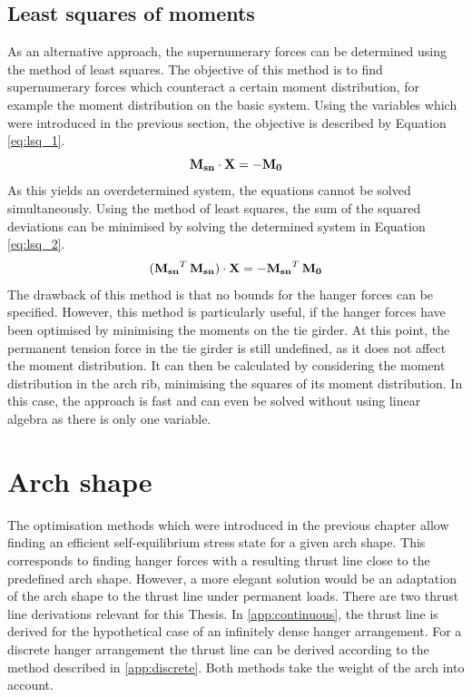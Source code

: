\subsection{Least squares of moments} \label{sec:least_squares}
As an alternative approach, the supernumerary forces can be determined using the method of least squares. The objective of this method is to find supernumerary forces which counteract a certain moment distribution, for example the moment distribution on the basic system. Using the variables which were introduced in the previous section, the objective is described by Equation \eqref{eq:lsq_1}.
\begin{equation}
    {\bf M_{sn}} \cdot {\bf X} = -{\bf M_0}
    \label{eq:lsq_1}
\end{equation}
As this yields an overdetermined system, the equations cannot be solved simultaneously. Using the method of least squares, the sum of the squared deviations can be minimised by solving the determined system in Equation \eqref{eq:lsq_2}.
\begin{equation}
    ({\bf M_{sn}}^T\,{\bf M_{sn}}) \cdot {\bf X} = -{\bf M_{sn}}^T\,{\bf M_0}
    \label{eq:lsq_2}
\end{equation}
The drawback of this method is that no bounds for the hanger forces can be specified. However, this method is particularly useful, if the hanger forces have been optimised by minimising the moments on the tie girder. At this point, the permanent tension force in the tie girder is still undefined, as it does not affect the moment distribution. It can then be calculated by considering the moment distribution in the arch rib, minimising the squares of its moment distribution. In this case, the approach is fast and can even be solved without using linear algebra as there is only one variable.


\newpage
\section{Arch shape} \label{sec:met_arch}
The optimisation methods which were introduced in the previous chapter allow finding an efficient self-equilibrium stress state for a given arch shape. This corresponds to finding hanger forces with a resulting thrust line close to the predefined arch shape. However, a more elegant solution would be an adaptation of the arch shape to the thrust line under permanent loads. There are two thrust line derivations relevant for this Thesis. In \cref{app:continuous}, the thrust line is derived for the hypothetical case of an infinitely dense hanger arrangement. For a discrete hanger arrangement the thrust line can be derived according to the method described in \cref{app:discrete}. Both methods take the weight of the arch into account.

